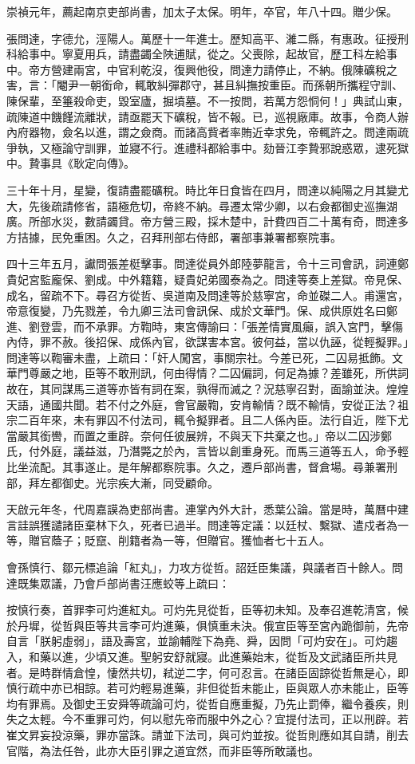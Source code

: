 \begin{pinyinscope}
崇禎元年，薦起南京吏部尚書，加太子太保。明年，卒官，年八十四。贈少保。

張問達，字德允，涇陽人。萬歷十一年進士。歷知高平、濰二縣，有惠政。征授刑科給事中。寧夏用兵，請盡蠲全陜逋賦，從之。父喪除，起故官，歷工科左給事中。帝方營建兩宮，中官利乾沒，復興他役，問達力請停止，不納。俄陳礦稅之害，言：「閹尹一朝銜命，輒敢糾彈郡守，甚且糾撫按重臣。而孫朝所攜程守訓、陳保輩，至箠殺命吏，毀室廬，掘墳墓。不一按問，若萬方怨恫何！」典試山東，疏陳道中饑饉流離狀，請亟罷天下礦稅，皆不報。已，巡視廠庫。故事，令商人辦內府器物，僉名以進，謂之僉商。而諸高貲者率賄近幸求免，帝輒許之。問達兩疏爭執，又極論守訓罪，並寢不行。進禮科都給事中。劾晉江李贄邪說惑眾，逮死獄中。贄事具《耿定向傳》。

三十年十月，星變，復請盡罷礦稅。時比年日食皆在四月，問達以純陽之月其變尤大，先後疏請修省，語極危切，帝終不納。尋遷太常少卿，以右僉都御史巡撫湖廣。所部水災，數請蠲貸。帝方營三殿，採木楚中，計費四百二十萬有奇，問達多方拮據，民免重困。久之，召拜刑部右侍郎，署部事兼署都察院事。

四十三年五月，讞問張差梃擊事。問達從員外郎陸夢龍言，令十三司會訊，詞連鄭貴妃宮監龐保、劉成。中外籍籍，疑貴妃弟國泰為之。問達等奏上差獄。帝見保、成名，留疏不下。尋召方從哲、吳道南及問達等於慈寧宮，命並磔二人。甫還宮，帝意復變，乃先戮差，令九卿三法司會訊保、成於文華門。保、成供原姓名曰鄭進、劉登雲，而不承罪。方鞫時，東宮傳諭曰：「張差情實風癲，誤入宮門，擊傷內侍，罪不赦。後招保、成係內官，欲謀害本宮。彼何益，當以仇誣，從輕擬罪。」問達等以鞫審未盡，上疏曰：「奸人闖宮，事關宗社。今差已死，二囚易抵飾。文華門尊嚴之地，臣等不敢刑訊，何由得情？二囚偏詞，何足為據？差雖死，所供詞故在，其同謀馬三道等亦皆有詞在案，孰得而滅之？況慈寧召對，面諭並決。煌煌天語，通國共聞。若不付之外庭，會官嚴鞫，安肯輸情？既不輸情，安從正法？祖宗二百年來，未有罪囚不付法司，輒令擬罪者。且二人係內臣。法行自近，陛下尤當嚴其銜轡，而置之重辟。奈何任彼展辨，不與天下共棄之也。」帝以二囚涉鄭氏，付外庭，議益滋，乃潛斃之於內，言皆以創重身死。而馬三道等五人，命予輕比坐流配。其事遂止。是年解都察院事。久之，遷戶部尚書，督倉場。尋兼署刑部，拜左都御史。光宗疾大漸，同受顧命。

天啟元年冬，代周嘉謨為吏部尚書。連掌內外大計，悉葉公論。當是時，萬曆中建言詿誤獲譴諸臣棄林下久，死者已過半。問達等定議：以廷杖、繫獄、遣戍者為一等，贈官蔭子；貶竄、削籍者為一等，但贈官。獲恤者七十五人。

會孫慎行、鄒元標追論「紅丸」，力攻方從哲。詔廷臣集議，與議者百十餘人。問達既集眾議，乃會戶部尚書汪應蛟等上疏曰：

按慎行奏，首罪李可灼進紅丸。可灼先見從哲，臣等初未知。及奉召進乾清宮，候於丹墀，從哲與臣等共言李可灼進藥，俱慎重未決。俄宣臣等至宮內跪御前，先帝自言「朕躬虛弱」，語及壽宮，並諭輔陛下為堯、舜，因問「可灼安在」。可灼趨入，和藥以進，少頃又進。聖躬安舒就寢。此進藥始末，從哲及文武諸臣所共見者。是時群情倉惶，悽然共切，弒逆二字，何可忍言。在諸臣固諒從哲無是心，即慎行疏中亦已相諒。若可灼輕易進藥，非但從哲未能止，臣與眾人亦未能止，臣等均有罪焉。及御史王安舜等疏論可灼，從哲自應重擬，乃先止罰俸，繼令養疾，則失之太輕。今不重罪可灼，何以慰先帝而服中外之心？宜提付法司，正以刑辟。若崔文昇妄投涼藥，罪亦當誅。請並下法司，與可灼並按。從哲則應如其自請，削去官階，為法任咎，此亦大臣引罪之道宜然，而非臣等所敢議也。


\end{pinyinscope}
